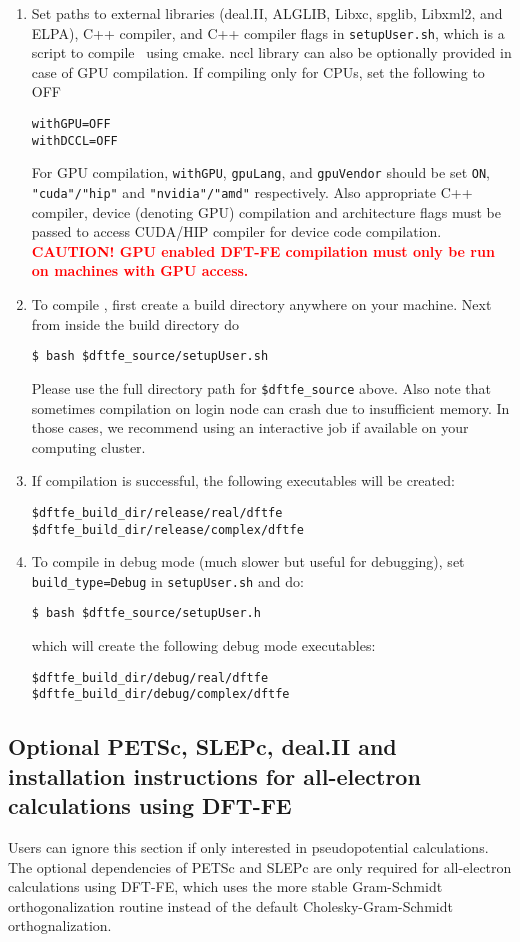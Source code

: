 \begin{enumerate}
\item Set paths to external libraries (deal.II, ALGLIB, Libxc, spglib, Libxml2, and ELPA), C++ compiler, and C++ compiler flags in \verb|setupUser.sh|, which is a script to compile \dftfe~using cmake. nccl library can also be optionally provided in case of GPU compilation. If compiling only for CPUs, set the following to OFF
\begin{verbatim}
withGPU=OFF
withDCCL=OFF
\end{verbatim}
For GPU compilation, \verb|withGPU|, \verb|gpuLang|, and \verb|gpuVendor| should be set \verb|ON|, \verb|"cuda"/"hip"| and \verb|"nvidia"/"amd"| respectively. Also appropriate C++ compiler, device (denoting GPU) compilation and architecture flags must be passed to access CUDA/HIP compiler for device code compilation. \textcolor{red}{\bf CAUTION! GPU enabled DFT-FE compilation must only be run on machines with GPU access.} 
\item To compile \dftfe{}, first create a build directory anywhere on your machine. Next from inside the build directory do
\begin{verbatim}
$ bash $dftfe_source/setupUser.sh
\end{verbatim} 
Please use the full directory path for \verb|$dftfe_source| above. Also note that sometimes compilation on login node can crash due to insufficient memory. In those cases, we recommend using an interactive job if available on your computing cluster.

\item If compilation is successful, the following executables will be created:
\begin{verbatim}
$dftfe_build_dir/release/real/dftfe
$dftfe_build_dir/release/complex/dftfe
\end{verbatim}

\item
To compile \dftfe{} in debug mode (much slower but useful for debugging), set \verb|build_type=Debug| in \verb|setupUser.sh| and do:
\begin{verbatim}
$ bash $dftfe_source/setupUser.h
\end{verbatim}
which will create the following debug mode executables:
\begin{verbatim}
$dftfe_build_dir/debug/real/dftfe
$dftfe_build_dir/debug/complex/dftfe
\end{verbatim}
\end{enumerate}



\subsection{Optional PETSc, SLEPc, deal.II and \dftfe~ installation instructions for all-electron calculations using DFT-FE}
Users can ignore this section if only interested in pseudopotential calculations. The optional dependencies of PETSc and SLEPc are only required for all-electron calculations using DFT-FE, which uses the more stable Gram-Schmidt orthogonalization routine instead of the default Cholesky-Gram-Schmidt orthognalization. 
    
